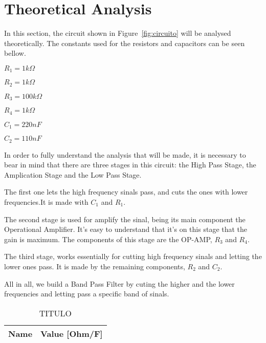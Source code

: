 \section{Theoretical Analysis}
\label{sec:analysis}

\hspace{0,5cm} In this section, the  circuit shown in Figure~\ref{fig:circuito} will be analysed theoretically.
The constants used for the resistors and capacitors can be seen bellow.

\begin{center}

$R_1 = 1 k\Omega$

$R_2 = 1 k\Omega$
 
$R_3 = 100 k\Omega $

$R_4 = 1 k\Omega $ 

$C_1 = 220 nF $

$C_2 = 110 nF $

\end{center}

\par In order to fully understand the analysis that will be made, it is necessary to bear in mind that there are three stages in this circuit: the High Pass Stage, the Amplication Stage and the Low Pass Stage. 
\par The first one lets the high frequency sinals pass, and cuts the ones with lower frequencies.It is made with $C_1$ and $R_1$. 
\par The second stage is used for amplify the sinal, being its main component the Operational Amplifier. It's easy to understand that it's on this stage that the gain is maximum. The components of this stage are the OP-AMP, $R_3$ and $R_4$. 
\par The third stage, works essentially for cutting high frequency sinals and letting the lower ones pass. It is made by the remaining components, $R_2$ and $C_2$. 
\par All in all, we build a Band Pass Filter by cuting the higher and the lower frequencies and letting pass a specific band of sinals.

\begin{table}[H]
  \centering
  \begin{tabular}{|l|r|}
    \hline    
    {\bf Name} & {\bf Value [Ohm/F]} \\ \hline
    
  \end{tabular}
  \caption{TITULO}
  \label{tab:mat1}
\end{table}

